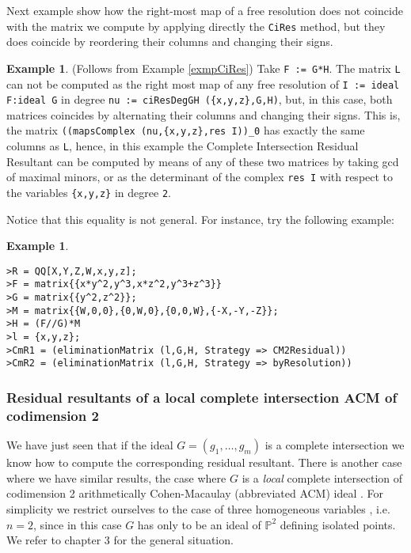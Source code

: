 \documentclass[10pt]{amsart}
\theoremstyle{plain}
\theoremstyle{definition}
\newtheorem{exmp}[thm]{Example}
\def\PP{{\mathbb{P}}}
\begin{document}
Next example show how the right-most map of a free resolution does not coincide with the matrix we compute by applying directly the \texttt{CiRes} method, but they does coincide by reordering their columns and changing their signs.

\begin{exmp}
(Follows from Example \ref{exmpCiRes}) Take \texttt{F := G*H}. The matrix \texttt{L}  can not be computed as the right most map of any free resolution of \texttt{I := ideal F:ideal G} in degree \texttt{nu := ciResDegGH (\{x,y,z\},G,H)}, but, in this case, both matrices coincides by alternating their columns and changing their signs. This is, the matrix \texttt{((mapsComplex (nu,\{x,y,z\},res I))\_0} has exactly the same columns as \texttt{L}, hence, in this example the Complete Intersection Residual Resultant can be computed by means of any of these two matrices by taking gcd of maximal minors, or as the determinant of the complex \texttt{res I} with respect to the variables \texttt{\{x,y,z\}} in degree \texttt{2}.
\end{exmp}

Notice that this equality is not general. For instance, try the following example:
\begin{exmp} \
\begin{verbatim}
>R = QQ[X,Y,Z,W,x,y,z];
>F = matrix{{x*y^2,y^3,x*z^2,y^3+z^3}}
>G = matrix{{y^2,z^2}};
>M = matrix{{W,0,0},{0,W,0},{0,0,W},{-X,-Y,-Z}};
>H = (F//G)*M
>l = {x,y,z};
>CmR1 = (eliminationMatrix (l,G,H, Strategy => CM2Residual))
>CmR2 = (eliminationMatrix (l,G,H, Strategy => byResolution))	
\end{verbatim} 
\end{exmp}

\subsubsection{Residual resultants of a local complete intersection ACM of codimension 2}\label{cm2res}

We have just seen that if the ideal $G=(g_1,\ldots,g_m)$ is a complete intersection we know how
to compute the corresponding residual resultant. There is another case
where we have similar results, the case where $G$ is a \emph{local}
complete intersection of codimension 2 arithmetically Cohen-Macaulay
(abbreviated ACM) ideal \cite{BusPhD}. For simplicity we restrict
ourselves to the case of three homogeneous variables \cite{Bus01},
i.e. $n=2$, since in this case $G$ has only to be an ideal of $\PP^2$
defining isolated points. We refer to \cite{BusPhD} chapter 3 for the
general situation.
\end{document}
